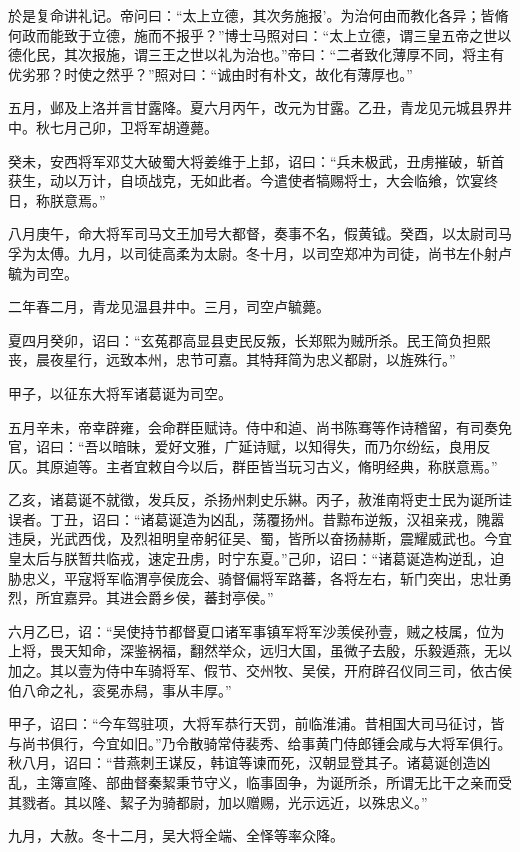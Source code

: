 \documentclass[12pt,UTF8]{ctexbook}
\begin{document}
於是复命讲礼记。帝问曰：“太上立德，其次务施报'。为治何由而教化各异；皆脩何政而能致于立德，施而不报乎？”博士马照对曰：“太上立德，谓三皇五帝之世以德化民，其次报施，谓三王之世以礼为治也。”帝曰：“二者致化薄厚不同，将主有优劣邪？时使之然乎？”照对曰：“诚由时有朴文，故化有薄厚也。”

五月，邺及上洛并言甘露降。夏六月丙午，改元为甘露。乙丑，青龙见元城县界井中。秋七月己卯，卫将军胡遵薨。

癸未，安西将军邓艾大破蜀大将姜维于上邽，诏曰：“兵未极武，丑虏摧破，斩首获生，动以万计，自顷战克，无如此者。今遣使者犒赐将士，大会临飨，饮宴终日，称朕意焉。”

八月庚午，命大将军司马文王加号大都督，奏事不名，假黄钺。癸酉，以太尉司马孚为太傅。九月，以司徒高柔为太尉。冬十月，以司空郑冲为司徒，尚书左仆射卢毓为司空。

二年春二月，青龙见温县井中。三月，司空卢毓薨。

夏四月癸卯，诏曰：“玄菟郡高显县吏民反叛，长郑熙为贼所杀。民王简负担熙丧，晨夜星行，远致本州，忠节可嘉。其特拜简为忠义都尉，以旌殊行。”

甲子，以征东大将军诸葛诞为司空。

五月辛未，帝幸辟雍，会命群臣赋诗。侍中和逌、尚书陈骞等作诗稽留，有司奏免官，诏曰：“吾以暗昧，爱好文雅，广延诗赋，以知得失，而乃尔纷纭，良用反仄。其原逌等。主者宜敕自今以后，群臣皆当玩习古义，脩明经典，称朕意焉。”

乙亥，诸葛诞不就徵，发兵反，杀扬州刺史乐綝。丙子，赦淮南将吏士民为诞所诖误者。丁丑，诏曰：“诸葛诞造为凶乱，荡覆扬州。昔黥布逆叛，汉祖亲戎，隗嚣违戾，光武西伐，及烈祖明皇帝躬征吴、蜀，皆所以奋扬赫斯，震耀威武也。今宜皇太后与朕暂共临戎，速定丑虏，时宁东夏。”己卯，诏曰：“诸葛诞造构逆乱，迫胁忠义，平寇将军临渭亭侯庞会、骑督偏将军路蕃，各将左右，斩门突出，忠壮勇烈，所宜嘉异。其进会爵乡侯，蕃封亭侯。”

六月乙巳，诏：“吴使持节都督夏口诸军事镇军将军沙羡侯孙壹，贼之枝属，位为上将，畏天知命，深鉴祸福，翻然举众，远归大国，虽微子去殷，乐毅遁燕，无以加之。其以壹为侍中车骑将军、假节、交州牧、吴侯，开府辟召仪同三司，依古侯伯八命之礼，衮冕赤舄，事从丰厚。”

甲子，诏曰：“今车驾驻项，大将军恭行天罚，前临淮浦。昔相国大司马征讨，皆与尚书俱行，今宜如旧。”乃令散骑常侍裴秀、给事黄门侍郎锺会咸与大将军俱行。秋八月，诏曰：“昔燕刺王谋反，韩谊等谏而死，汉朝显登其子。诸葛诞创造凶乱，主簿宣隆、部曲督秦絜秉节守义，临事固争，为诞所杀，所谓无比干之亲而受其戮者。其以隆、絜子为骑都尉，加以赠赐，光示远近，以殊忠义。”

九月，大赦。冬十二月，吴大将全端、全怿等率众降。
\end{document}
